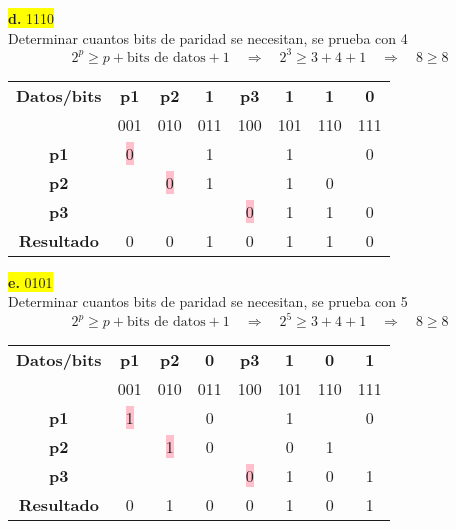 \documentclass{article}
\begin{document}
	\begin{center}
		\hspace{3cm}\colorbox{yellow}{{\textbf{d.} 1110}}\newline
		\\Determinar cuantos bits de paridad se necesitan, se prueba con 4
		\[
		2^p \geq p + \text{bits de datos} + 1
		\quad \Rightarrow \quad	2^3 \geq 3 + 4 + 1 \quad \Rightarrow \quad 8 \geq 8
		\]
		
		\begin{table}[h!]
			\centering
			\begin{tabular}{c|ccccccc}
				\toprule
				\textbf{Datos/bits} & \textbf{p1} & \textbf{p2} & \textbf{1} & \textbf{p3} & \textbf{1} & \textbf{1} & \textbf{0}\\ & \scriptsize001 & \scriptsize010 & \scriptsize011 & \scriptsize100 & \scriptsize101 & \scriptsize110 & \scriptsize111\\
				\midrule
				\textbf{p1} & \colorbox{pink}{0} & & 1 & & 1 & & 0\\
				\midrule
				\textbf{p2} &  & \colorbox{pink}{0} & 1 & & 1 & 0  \\
				\midrule
				\textbf{p3} & & & & \colorbox{pink}{0} & 1 & 1 & 0 \\
				\midrule
				\textbf{Resultado} & 0 & 0 & 1 & 0 & 1 & 1 & 0\\
				\bottomrule
			\end{tabular}
		\end{table}
	\end{center}
	\begin{center}
		\hspace{3cm}\colorbox{yellow}{{\textbf{e.} 0101}}\newline
		\\Determinar cuantos bits de paridad se necesitan, se prueba con 5
		\[
		2^p \geq p + \text{bits de datos} + 1
		\quad \Rightarrow \quad	2^5 \geq 3 + 4 + 1 \quad \Rightarrow \quad 8 \geq 8
		\]
		
		\begin{table}[h!]
			\centering
			\begin{tabular}{c|ccccccc}
				\toprule
				\textbf{Datos/bits} & \textbf{p1} & \textbf{p2} & \textbf{0} & \textbf{p3} & \textbf{1} & \textbf{0} & \textbf{1}\\ & \scriptsize001 & \scriptsize010 & \scriptsize011 & \scriptsize100 & \scriptsize101 & \scriptsize110 & \scriptsize111\\
				\midrule
				\textbf{p1} & \colorbox{pink}{1} & & 0 & & 1 & & 0\\
				\midrule
				\textbf{p2} &  & \colorbox{pink}{1} & 0 & & 0 & 1 \\
				\midrule
				\textbf{p3} & & & & \colorbox{pink}{0} & 1 & 0 & 1 \\
				\midrule
				\textbf{Resultado} & 0 & 1 & 0 & 0 & 1 & 0 & 1\\
				\bottomrule
			\end{tabular}
		\end{table}
		
		
	\end{center}
\end{document}
